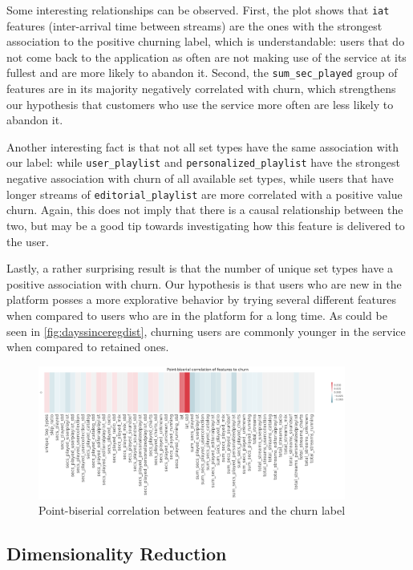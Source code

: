 \documentclass{kththesis}
\begin{document}
Some interesting relationships can be observed. First, the plot shows that \verb|iat| features (inter-arrival time between streams) are the ones with the strongest association to the positive churning label, which is understandable: users that do not come back to the application as often are not making use of the service at its fullest and are more likely to abandon it. Second, the \verb|sum_sec_played| group of features are in its majority negatively correlated with churn, which strengthens our hypothesis that customers who use the service more often are less likely to abandon it. 

Another interesting fact is that not all set types have the same association with our label: while \verb|user_playlist| and \verb|personalized_playlist| have the strongest negative association with churn of all available set types, while users that have longer streams of \verb|editorial_playlist| are more correlated with a positive value churn. Again, this does not imply that there is a causal relationship between the two, but may be a good tip towards investigating how this feature is delivered to the user.

Lastly, a rather surprising result is that the number of unique set types have a positive association with churn. Our hypothesis is that users who are new in the platform posses a more explorative behavior by trying several different features when compared to users who are in the platform for a long time. As could be seen in \autoref{fig:dayssinceregdist}, churning users are commonly younger in the service when compared to retained ones. 

	\begin{figure}[H]
    \centering
    \includegraphics[width=0.9\textwidth,keepaspectratio]{figures/corr_pbs.pdf}
    \caption{Point-biserial correlation between features and the churn label}
    \label{fig:corr_pbs}
	\end{figure}

\subsection{Dimensionality Reduction}
\end{document}
